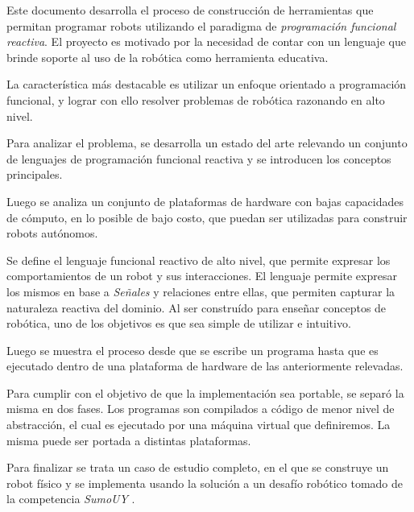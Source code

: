   Este documento desarrolla el proceso de construcción de
herramientas que permitan programar robots utilizando
el paradigma de \emph{programación funcional reactiva}.
  El proyecto es motivado por la necesidad de contar con
un lenguaje que brinde soporte al uso de la robótica
como herramienta educativa.

  La característica más destacable es utilizar un enfoque
orientado a programación funcional, y lograr con ello resolver problemas
de robótica razonando en alto nivel.

  Para analizar el problema, se desarrolla un estado del
arte relevando un conjunto de lenguajes de programación funcional
reactiva y se introducen los conceptos principales.

  Luego se analiza un conjunto de plataformas de hardware con bajas
capacidades de cómputo, en lo posible de bajo costo, que puedan
ser utilizadas para construir robots autónomos.

  Se define el lenguaje \frob{} funcional reactivo de alto nivel,
que permite expresar los comportamientos de un robot y sus
interacciones.
  El lenguaje permite expresar los mismos en base a
\emph{Señales} y relaciones entre ellas, que permiten
capturar la naturaleza reactiva del dominio.
  Al ser construído para enseñar conceptos de robótica,
uno de los objetivos es que sea simple de utilizar e intuitivo.

  Luego se muestra el proceso desde que se escribe un programa \frob{}
hasta que es ejecutado dentro de una plataforma de hardware de las
anteriormente relevadas.

  Para cumplir con el objetivo de que la implementación sea
portable, se separó la misma en dos fases.
  Los programas \frob{} son compilados a código \alf{} de
menor nivel de abstracción, el cual es ejecutado por una
máquina virtual que definiremos.
  La misma puede ser portada a distintas plataformas.

  Para finalizar se trata un caso de estudio completo, en el
que se construye un robot físico y se implementa usando \frob{}
la solución a un desafío robótico tomado de la
competencia \textit{SumoUY} \cite{sumouy}.
